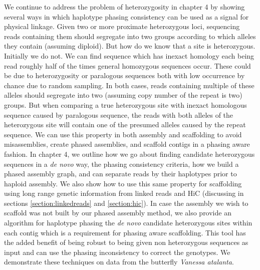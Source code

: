 \par{
We continue to address the problem of heterozygosity in chapter 4 by showing several ways in which haplotype phasing consistency can be used as a signal for physical linkage. Given two or more proximate heterozygous loci, sequencing reads containing them should segregate into two groups according to which alleles they contain (assuming diploid). But how do we know that a site is heterozygous. Initially we do not. We can find sequence which has inexact homology each being read roughly half of the times general homozygous sequences occur. These could be due to heterozygosity or paralogous sequences both with low occurrence by chance due to random sampling. In both cases, reads containing multiple of these alleles should segregate into two (assuming copy number of the repeat is two) groups. But when comparing a true heterozygous site with inexact homologous sequence caused by paralogous sequence, the reads with both alleles of the heterozygous site will contain one of the presumed alleles caused by the repeat sequence. We can use this property in both assembly and scaffolding to avoid misassemblies, create phased assemblies, and scaffold contigs in a phasing aware fashion. In chapter 4, we outline how we go about finding candidate heterozygous sequences in a \textit{de novo} way, the phasing consistency criteria, how we build a phased assembly graph, and can separate reads by their haplotypes prior to haploid assembly. We also show how to use this same property for scaffolding using long range genetic information from linked reads and HiC (discussing in sections \ref{section:linkedreads} and \ref{section:hic}). In case the assembly we wish to scaffold was not built by our phased assembly method, we also provide an algorithm for haplotype phasing the \textit{de novo} candidate heterozygous sites within each contig which is a requirement for phasing aware scaffolding. This tool has the added benefit of being robust to being given non heterozygous sequences as input and can use the phasing inconsistency to correct the genotypes. We demonstrate these techniques on data from the butterfly \textit{Vanessa atalanta}.
} \\

